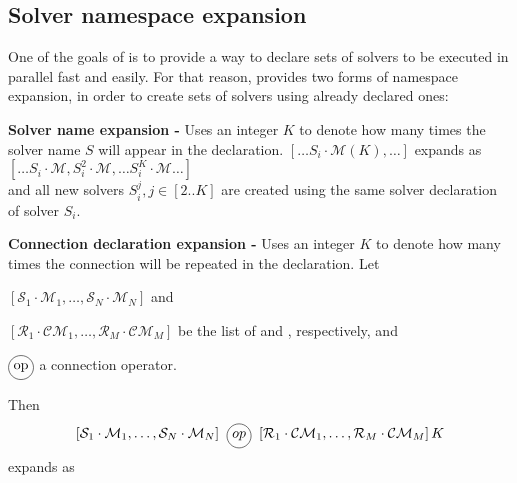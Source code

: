 
\subsection{Solver namespace expansion}

One of the goals of \posl{} is to provide a way to declare sets of solvers to be executed in parallel fast and easily. For that reason, \posl{} provides two forms of namespace expansion, in order to create sets of solvers using already declared ones:

\textbf{Solver name expansion - } Uses an integer $K$ to denote how many times the solver name $S$ will appear in the declaration. $\left[\dots S_i\cdot\mathcal{M}(K),\dots\right]$ expands as $\left[\dots S_i\cdot\mathcal{M}, S_i^2\cdot\mathcal{M},\dots S_i^K\cdot\mathcal{M}\dots\right]$\\
and all new solvers $S_i^j, j\in [2..K]$ are created using the same solver declaration of solver $S_i$.

\textbf{Connection declaration expansion - } Uses an integer $K$ to denote how many times the connection will be repeated in the declaration. Let 
\begin{inparaenum}[a)]
\item $\left[\mathcal{S}_1\cdot\mathcal{M}_1,\dots,\mathcal{S}_{N}\cdot\mathcal{M}_{N}\right]$ and 
\item $\left[\mathcal{R}_1\cdot\mathcal{CM}_1,\dots,\mathcal{R}_{M}\cdot\mathcal{CM}_{M}\right]$ be the list of \jacks{} and \outlets, respectively, and
\item $\circled{op}$ a connection operator.
\end{inparaenum} Then $$\left[\mathcal{S}_1\cdot\mathcal{M}_1,\dots,\mathcal{S}_{N}\cdot\mathcal{M}_{N}\right] \poslop{op} \left[\mathcal{R}_1\cdot\mathcal{CM}_1,\dots,\mathcal{R}_{M}\cdot\mathcal{CM}_{M}\right]K$$ expands as

